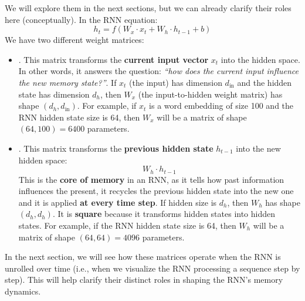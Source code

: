 \begin{flushleft}
\end{flushleft}
We will explore them in the next sections, but we can already clarify their roles here (conceptually). In the RNN equation:
\begin{equation*}
    h_t = f\left(W_x \cdot x_t + W_h \cdot h_{t-1} + b\right)
\end{equation*}
We have two different weight matrices:
\begin{itemize}
    \item {}. This matrix transforms the \textbf{current input vector} $x_t$ into the hidden space. In other words, it answers the question: \emph{``how does the current input influence the new memory state?''}. If $x_t$ (the input) has dimension $d_{\text{in}}$ and the hidden state has dimension $d_{h}$, then $W_x$ (the input-to-hidden weight matrix) has shape $(d_h, d_{\text{in}})$. For example, if $x_t$ is a word embedding of size 100 and the RNN hidden state size is 64, then $W_x$ will be a matrix of shape $(64, 100) = 6400$ parameters.


    \item {}. This matrix transforms the \textbf{previous hidden state} $h_{t-1}$ into the new hidden space:
    \begin{equation*}
        W_h \cdot h_{t-1}
    \end{equation*}
    This is the \textbf{core of memory} in an RNN, as it tells how past information influences the present, it recycles the previous hidden state into the new one and it is applied \textbf{at every time step}. If hidden size is $d_h$, then $W_h$ has shape $(d_h, d_h)$. It is \textbf{square} because it transforms hidden states into hidden states. For example, if the RNN hidden state size is 64, then $W_h$ will be a matrix of shape $(64, 64) = 4096$ parameters.
\end{itemize}
In the next section, we will see how these matrices operate when the RNN is unrolled over time (i.e., when we visualize the RNN processing a sequence step by step). This will help clarify their distinct roles in shaping the RNN's memory dynamics.